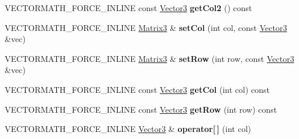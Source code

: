 \begin{DoxyCompactItemize}
\item 
\mbox{\label{classVectormath_1_1Aos_1_1Matrix3_ab16e1463ed9b8f0ced262f5fef17321c}} 
V\+E\+C\+T\+O\+R\+M\+A\+T\+H\+\_\+\+F\+O\+R\+C\+E\+\_\+\+I\+N\+L\+I\+NE const \hyperlink{classVectormath_1_1Aos_1_1Vector3}{Vector3} {\bfseries get\+Col2} () const
\item 
\mbox{\label{classVectormath_1_1Aos_1_1Matrix3_af4ffa007f94bfbe10d7e0256eba7b25d}} 
V\+E\+C\+T\+O\+R\+M\+A\+T\+H\+\_\+\+F\+O\+R\+C\+E\+\_\+\+I\+N\+L\+I\+NE \hyperlink{classVectormath_1_1Aos_1_1Matrix3}{Matrix3} \& {\bfseries set\+Col} (int col, const \hyperlink{classVectormath_1_1Aos_1_1Vector3}{Vector3} \&vec)
\item 
\mbox{\label{classVectormath_1_1Aos_1_1Matrix3_a99430a86fcb7a83ae5bf226d90921d17}} 
V\+E\+C\+T\+O\+R\+M\+A\+T\+H\+\_\+\+F\+O\+R\+C\+E\+\_\+\+I\+N\+L\+I\+NE \hyperlink{classVectormath_1_1Aos_1_1Matrix3}{Matrix3} \& {\bfseries set\+Row} (int row, const \hyperlink{classVectormath_1_1Aos_1_1Vector3}{Vector3} \&vec)
\item 
\mbox{\label{classVectormath_1_1Aos_1_1Matrix3_a9f2ec00bd0b761beb9a3057fc5d787f2}} 
V\+E\+C\+T\+O\+R\+M\+A\+T\+H\+\_\+\+F\+O\+R\+C\+E\+\_\+\+I\+N\+L\+I\+NE const \hyperlink{classVectormath_1_1Aos_1_1Vector3}{Vector3} {\bfseries get\+Col} (int col) const
\item 
\mbox{\label{classVectormath_1_1Aos_1_1Matrix3_a5d9491d1f62da50fcdb590868323dbc7}} 
V\+E\+C\+T\+O\+R\+M\+A\+T\+H\+\_\+\+F\+O\+R\+C\+E\+\_\+\+I\+N\+L\+I\+NE const \hyperlink{classVectormath_1_1Aos_1_1Vector3}{Vector3} {\bfseries get\+Row} (int row) const
\item 
\mbox{\label{classVectormath_1_1Aos_1_1Matrix3_a6978cc9868019aedcbd3eeaf9f5d48f1}} 
V\+E\+C\+T\+O\+R\+M\+A\+T\+H\+\_\+\+F\+O\+R\+C\+E\+\_\+\+I\+N\+L\+I\+NE \hyperlink{classVectormath_1_1Aos_1_1Vector3}{Vector3} \& {\bfseries operator\mbox{[}$\,$\mbox{]}} (int col)
\item 
\mbox{\label{classVectormath_1_1Aos_1_1Matrix3_a27d8097fac73c3eba26c01cb94c68c55}} 

\end{DoxyCompactItemize}
